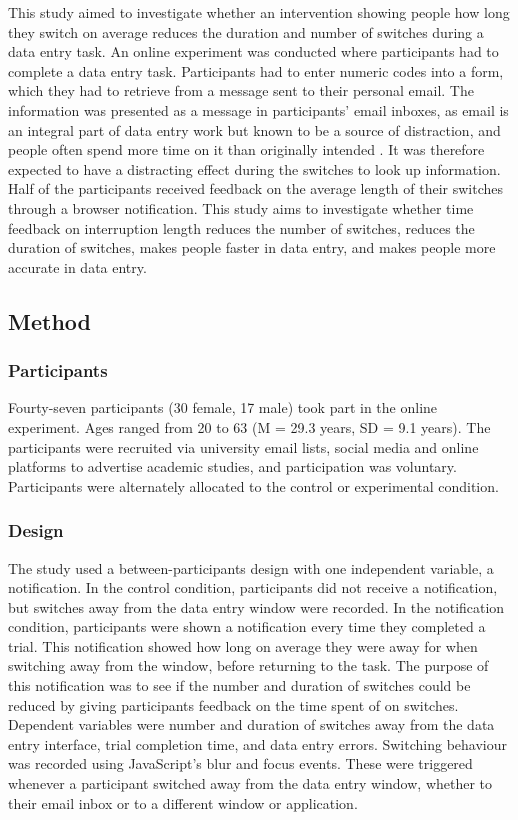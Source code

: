 This study aimed to investigate whether an intervention showing people how long they switch on average reduces the duration and number of switches during a data entry task. An online experiment was conducted where participants had to complete a data entry task. Participants had to enter numeric codes into a form, which they had to retrieve from a message sent to their personal email. The information was presented as a message in participants' email inboxes, as email is an integral part of data entry work but known to be a source of distraction, and people often spend more time on it than originally intended \citep{Hanrahan2015, Mark2016}. It was therefore expected to have a distracting effect during the switches to look up information. Half of the participants received feedback on the average length of their switches through a browser notification. 
This study aims to investigate whether time feedback on interruption length reduces the number of switches, reduces the duration of switches, makes people faster in data entry, and makes people more accurate in data entry.

\subsection{Method}
\subsubsection{Participants}
Fourty-seven participants (30 female, 17 male) took part in the online experiment. Ages ranged from 20 to 63 (M = 29.3 years, SD = 9.1 years). The participants were recruited via university email lists, social media and online platforms to advertise academic studies, and participation was voluntary. Participants were alternately allocated to the control or experimental condition.

\subsubsection{Design}
The study used a between-participants design with one independent variable, a notification. In the control condition, participants did not receive a notification, but switches away from the data entry window were recorded. In the notification condition, participants were shown a notification every time they completed a trial. This notification showed how long on average they were away for when switching away from the window, before returning to the task. The purpose of this notification was to see if the number and duration of switches could be reduced by giving participants feedback on the time spent of on switches. Dependent variables were number and duration of switches away from the data entry interface, trial completion time, and data entry errors. Switching behaviour was recorded using JavaScript's blur and focus events. These were triggered whenever a participant switched away from the data entry window, whether to their email inbox or to a different window or application. 

